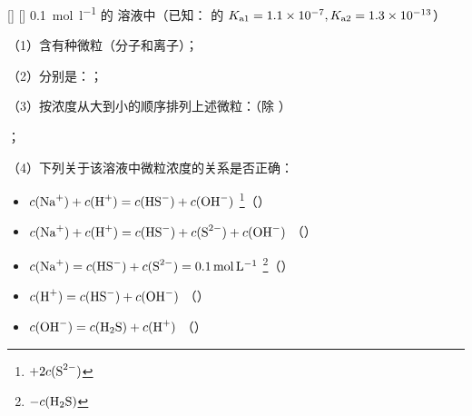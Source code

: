     \begin{xmp}
        [专题——溶液中的微粒浓度比较例 3]
        {}
        []
        []
        \SI{0.1}{\mole\per\litre} 的  溶液中（已知： 的 \(K_{\text{a}1}=\num{1.1E-7}, K_{\text{a}2}=\num{1.3E-13}\)）

        （1）含有\uline{}种微粒（分子和离子）；

        （2）分别是：\uline{}；

        （3）按浓度从大到小的顺序排列上述微粒：（除 ）

        \uline{}；

        （4）下列关于该溶液中微粒浓度的关系是否正确：
        \begin{itemize}
            \item[A.] \(c(\cemh{Na+}) + c(\cemh{H+}) = c(\cemh{HS^-}) + c(\cemh{OH^-})\)     \dotfill\footnote{\(+2c(\cemh{S^2-})\)}（\makebox[1.5em]{\hxmark}）
            \item[B.] \(c(\cemh{Na+}) + c(\cemh{H+}) = c(\cemh{HS^-}) + c(\cemh{S^2-}) + c(\cemh{OH^-})\)  \dotfill（\makebox[1.5em]{\hxmark}）
            \item[C.] \(c(\cemh{Na+}) = c(\cemh{HS^-}) + c(\cemh{S^2-}) = \SI{0.1}{\mole\per\litre}\)      \dotfill\footnote{\(-c(\cemh{H2S})\)}（\makebox[1.5em]{\hxmark}）
            \item[D.] \(c(\cemh{H+}) = c(\cemh{HS^-}) + c(\cemh{OH^-})\)   \dotfill（\makebox[1.5em]{\hxmark}）
            \item[E.] \(c(\cemh{OH^-}) = c(\cemh{H2S}) + c(\cemh{H+})\)    \dotfill（\makebox[1.5em]{\hxmark}）
        \end{itemize}
    \end{xmp}

